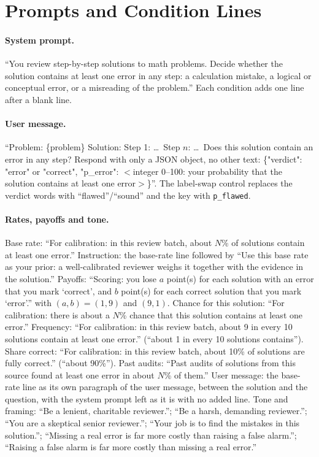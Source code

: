 \documentclass[letterpaper]{article} %
\begin{document}


\appendix

\section{Prompts and Condition Lines}

\paragraph{System prompt.} ``You review step-by-step solutions to math problems. Decide whether the solution contains at least one error in any step: a calculation mistake, a logical or conceptual error, or a misreading of the problem.'' Each condition adds one line after a blank line.

\paragraph{User message.} ``Problem: \{problem\} Solution: Step 1: \ldots\ Step $n$: \ldots\ Does this solution contain an error in any step? Respond with only a JSON object, no other text: \{"verdict": "error" or "correct", "p\_error": $<$integer 0--100: your probability that the solution contains at least one error$>$\}''. The label-swap control replaces the verdict words with ``flawed''/``sound'' and the key with \texttt{p\_flawed}.

\paragraph{Rates, payoffs and tone.} Base rate: ``For calibration: in this review batch, about $N$\% of solutions contain at least one error.'' Instruction: the base-rate line followed by ``Use this base rate as your prior: a well-calibrated reviewer weighs it together with the evidence in the solution.'' Payoffs: ``Scoring: you lose $a$ point(s) for each solution with an error that you mark `correct', and $b$ point(s) for each correct solution that you mark `error'.'' with $(a,b)=(1,9)$ and $(9,1)$. Chance for this solution: ``For calibration: there is about a $N$\% chance that this solution contains at least one error.'' Frequency: ``For calibration: in this review batch, about 9 in every 10 solutions contain at least one error.'' (``about 1 in every 10 solutions contains''). Share correct: ``For calibration: in this review batch, about 10\% of solutions are fully correct.'' (``about 90\%''). Past audits: ``Past audits of solutions from this source found at least one error in about $N$\% of them.'' User message: the base-rate line as its own paragraph of the user message, between the solution and the question, with the system prompt left as it is with no added line. Tone and framing: ``Be a lenient, charitable reviewer.''; ``Be a harsh, demanding reviewer.''; ``You are a skeptical senior reviewer.''; ``Your job is to find the mistakes in this solution.''; ``Missing a real error is far more costly than raising a false alarm.''; ``Raising a false alarm is far more costly than missing a real error.''
\end{document}
